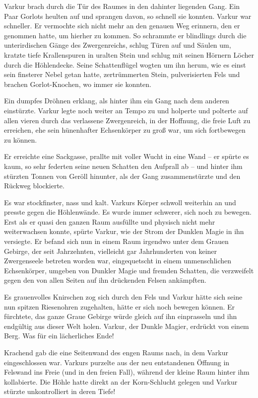 Varkur brach durch die Tür des Raumes in den dahinter liegenden Gang. Ein Paar Gorlots heulten auf und sprangen davon, so schnell sie konnten. Varkur war schneller. Er vermochte sich nicht mehr an den genauen Weg erinnern, den er genommen hatte, um hierher zu kommen. So schrammte er blindlings durch die unterirdischen Gänge des Zwergenreichs, schlug Türen auf und Säulen um, kratzte tiefe Krallenspuren in uralten Stein und schlug mit seinen Hörnern Löcher durch die Höhlendecke. Seine Schattenflügel wogten um ihn herum, wie es einst sein finsterer Nebel getan hatte, zertrümmerten Stein, pulverisierten Fels und brachen Gorlot-Knochen, wo immer sie konnten.

Ein dumpfes Dröhnen erklang, als hinter ihm ein Gang nach dem anderen einstürzte. Varkur legte noch weiter an Tempo zu und holperte und polterte auf allen vieren durch das verlassene Zwergenreich, in der Hoffnung, die freie Luft zu erreichen, ehe sein hünenhafter Echsenkörper zu groß war, um sich fortbewegen zu können.

Er erreichte eine Sackgasse, prallte mit voller Wucht in eine Wand – er spürte es kaum, so sehr federten seine neuen Schatten den Aufprall ab – und hinter ihm stürzten Tonnen von Geröll hinunter, als der Gang zusammenstürzte und den Rückweg blockierte.

Es war stockfinster, nass und kalt. Varkurs Körper schwoll weiterhin an und presste gegen die Höhlenwände. Es wurde immer schwerer, sich noch zu bewegen. Erst als er quasi den ganzen Raum ausfüllte und physisch nicht mehr weiterwachsen konnte, spürte Varkur, wie der Strom der Dunklen Magie in ihn versiegte. Er befand sich nun in einem Raum irgendwo unter dem Grauen Gebirge, der seit Jahrzehnten, vielleicht gar Jahrhunderten von keiner Zwergenseele betreten worden war, eingequetscht in einem unmenschlichen Echsenkörper, umgeben von Dunkler Magie und fremden Schatten, die verzweifelt gegen den von allen Seiten auf ihn drückenden Felsen ankämpften.

Es grauenvolles Knirschen zog sich durch den Fels und Varkur hätte sich seine nun spitzen Riesenohren zugehalten, hätte er sich noch bewegen können. Er fürchtete, das ganze Graue Gebirge würde gleich auf ihn einprasseln und ihn endgültig aus dieser Welt holen. Varkur, der Dunkle Magier, erdrückt von einem Berg. Was für ein lächerliches Ende!

Krachend gab die eine Seitenwand des engen Raums nach, in dem Varkur eingeschlossen war. Varkurs purzelte aus der neu entstandenen Öffnung in Felswand ins Freie (und in den freien Fall), während der kleine Raum hinter ihm kollabierte. Die Höhle hatte direkt an der Korn-Schlucht gelegen und Varkur stürzte unkontrolliert in deren Tiefe!

